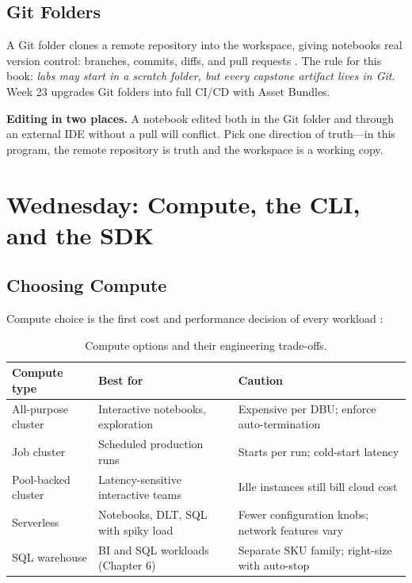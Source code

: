 \subsection{Git Folders}
A Git folder clones a remote repository into the workspace, giving notebooks real version control: branches, commits, diffs, and pull requests \cite{databricksRepos}. The rule for this book: \emph{labs may start in a scratch folder, but every capstone artifact lives in Git}. Week 23 upgrades Git folders into full CI/CD with Asset Bundles.

\begin{pitfall}
\textbf{Editing in two places.} A notebook edited both in the Git folder and through an external IDE without a pull will conflict. Pick one direction of truth---in this program, the remote repository is truth and the workspace is a working copy.
\end{pitfall}

\section{Wednesday: Compute, the CLI, and the SDK}
\subsection{Choosing Compute}
Compute choice is the first cost and performance decision of every workload \cite{databricksCompute}:

\begin{table}[H]
\centering
\small
\begin{tabular}{@{}p{3.4cm}p{4.4cm}p{5.4cm}@{}}
\toprule
\textbf{Compute type} & \textbf{Best for} & \textbf{Caution} \\
\midrule
All-purpose cluster & Interactive notebooks, exploration & Expensive per DBU; enforce auto-termination \\
Job cluster & Scheduled production runs & Starts per run; cold-start latency \\
Pool-backed cluster & Latency-sensitive interactive teams & Idle instances still bill cloud cost \\
Serverless & Notebooks, DLT, SQL with spiky load & Fewer configuration knobs; network features vary \\
SQL warehouse & BI and SQL workloads (Chapter 6) & Separate SKU family; right-size with auto-stop \\
\bottomrule
\end{tabular}
\caption{Compute options and their engineering trade-offs.}
\label{tab:ch1-compute}
\end{table}

